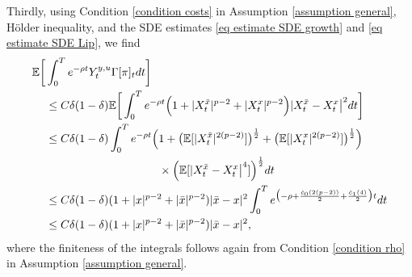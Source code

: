 \documentclass[11pt]{amsart}
\theoremstyle{plain}
\def \dd{{\rm d}}
\numberwithin{equation}{section}
\begin{document}
Thirdly, using Condition \ref{condition costs} in Assumption \ref{assumption general}, Hölder inequality, and the SDE estimates \eqref{eq estimate SDE growth} and \eqref{eq estimate SDE Lip}, we find
\begin{equation}
    \label{eq D pi}
    \begin{aligned}
        \mathbb{E} \bigg[ & \int_0^T e^{-\rho t} Y_t^{y,u} \Gamma [\pi] _t \dd t \bigg] \\
        & \leq C \delta (1-\delta) \mathbb E \bigg[ \int_0^T e^{-\rho t}  \Big( 
 1+     | X^{\bar x} _t |^{p-2}   +  | X^x _t |^{p-2} \Big) |  X^{\bar x} _t - X ^x_t \big|^2 \dd t \bigg] \\
        & \leq C \delta (1-\delta) \int_0^T e^{-\rho t}  \Big( 
 1+ \big( \mathbb{E}[ |X^{\bar x} _t |^{2(p-2)}] \big)^{\frac{1}{2}} + \big( \mathbb{E}[ | X^x _t |^{2(p-2)}] \big)^{\frac{1}{2}} \Big) 
\\
& \qquad \qquad \qquad \qquad \qquad \times \Big( \mathbb{E}[ | X^{\bar x} _t - X^x_t \big|^4 ] \Big)^{\frac12}  dt   \\
  &  \leq C \delta (1-\delta) ( 1 + |{x}|^{p-2} + |\bar{x}|^{p-2}) |\bar{x} - x|^2 \int_0^T e^{\big(-\rho  + \frac{ \hat c _0(2(p-2))}{2} + \frac{\hat c _1 (4)}{2} \big) t} \dd t \\
& \leq C \delta (1-\delta) ( 1 + |{x}|^{p-2} + |\bar{x}|^{p-2})  |\bar{x} - x|^2, 
    \end{aligned}
\end{equation}
where the finiteness of the integrals follows again from Condition \ref{condition rho} in Assumption \ref{assumption general}.
\end{document}
